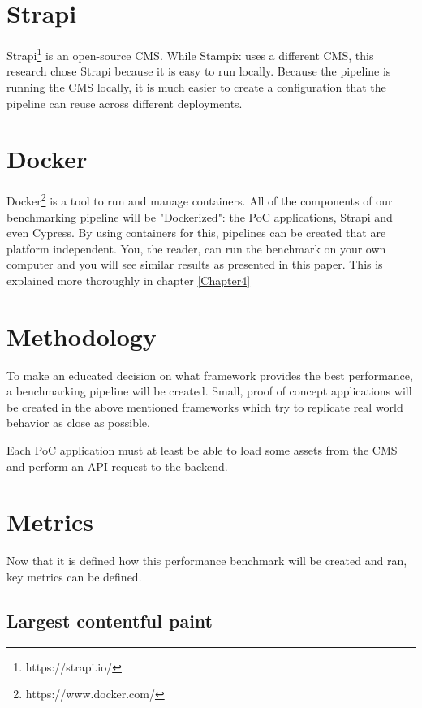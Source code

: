 \section{Strapi}

Strapi\footnote{https://strapi.io/} is an open-source CMS. While Stampix uses a different CMS, this research chose Strapi because it is easy to run locally. 
Because the pipeline is running the CMS locally, it is much easier to create a configuration that the pipeline can reuse across different deployments. 


\section{Docker}

Docker\footnote{https://www.docker.com/} is a tool to run and manage containers. All of the components of our benchmarking pipeline will be "Dockerized": the PoC applications, Strapi and even Cypress. 
By using containers for this, pipelines can be created that are platform independent. 
You, the reader, can run the benchmark on your own computer and you will see similar results as presented in this paper. This is explained more thoroughly in chapter \ref{Chapter4}


\section{Methodology}

To make an educated decision on what framework provides the best performance, a benchmarking pipeline will be created. 
Small, proof of concept applications will be created in the above mentioned frameworks which try to replicate real world behavior as close as possible.

Each PoC application must at least be able to load some assets from the CMS and perform an API request to the backend.


\section{Metrics}

Now that it is defined how this performance benchmark will be created and ran, key metrics can be defined.

\subsection{Largest contentful paint}

